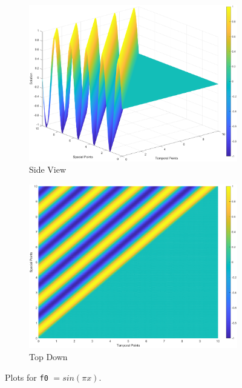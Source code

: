 \documentclass[]{article}
\def\incode#1{\texttt{#1}}
\begin{document}
	\begin{figure}[htbp]
		\centering
		\begin{subfigure}[b]{0.45\textwidth}
			\includegraphics[width=\textwidth]{images/f0_side.eps}
			\caption{Side View}
		\end{subfigure}
		\hfill
		\begin{subfigure}[b]{0.45\textwidth}
			\includegraphics[width=\textwidth]{images/f0_top.eps}
			\caption{Top Down}
		\end{subfigure}
		\caption{Plots for \incode{f0} $= sin(\pi x)$.}
		\label{fig:both_images}
	\end{figure}
\end{document}
